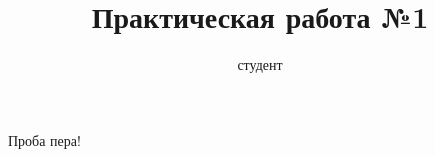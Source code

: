 \documentclass[a4paper,11pt]{article}
\title{Практическая работа №1}
\author{студент                         }
\begin{document}
\maketitle
Проба пера!
\end{document}
